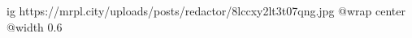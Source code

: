  
 
 
 
 

\ifcmt
  ig https://mrpl.city/uploads/posts/redactor/8lccxy2lt3t07qng.jpg
  @wrap center
  @width 0.6
\fi
